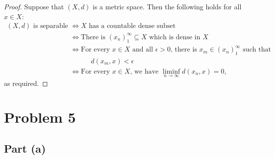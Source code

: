\documentclass[11pt]{article}
\begin{document}
\begin{proof}
  Suppose that $(X, d)$ is a metric space. Then the following holds for all $x \in X$:
  \begin{align*}
    \text{$(X, d)$ is separable} & \iff \text{$X$ has a countable dense subset} \\
                               & \iff \text{There is $(x_{n})_{1}^{\infty} \subseteq X$ which is dense in $X$} \\
                               & \iff \text{For every $x \in X$ and all $\epsilon > 0$, there is $x_{m} \in (x_{n})_{1}^{\infty}$ such that} \\
                               & \qquad  \quad  d(x_{m}, x) < \epsilon \\
                               & \iff \text{For every $x \in X$, we have }\liminf\limits_{n \to \infty} d(x_{n}, x) = 0,
  \end{align*}
  as required.
\end{proof}


\section{Problem 5}


\subsection{Part (a)}
\end{document}
